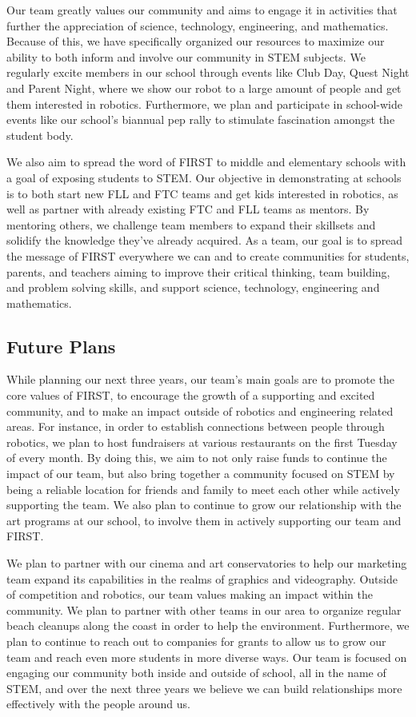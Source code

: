 Our team greatly values our community and aims to engage it in activities that further the appreciation of science, technology, engineering, and mathematics. Because of this, we have specifically organized our resources to maximize our ability to both inform and involve our community in STEM subjects. We regularly excite members in our school through events like Club Day, Quest Night and Parent Night, where we show our robot to a large amount of people and get them interested in robotics. Furthermore, we plan and participate in school-wide events like our school’s biannual pep rally to stimulate fascination amongst the student body. 

We also aim to spread the word of FIRST to middle and elementary schools with a goal of exposing students to STEM. Our objective in demonstrating at schools is to both start new FLL and FTC teams and get kids interested in robotics, as well as partner with already existing FTC and FLL teams as mentors. By mentoring others, we challenge team members to expand their skillsets and solidify the knowledge they’ve already acquired. As a team, our goal is to spread the message of FIRST everywhere we can and to create communities for students, parents, and teachers aiming to improve their critical thinking, team building, and problem solving skills, and support science, technology, engineering and mathematics.

\subsection{Future Plans}

While planning our next three years, our team’s main goals are to promote the core values of FIRST, to encourage the growth of a supporting and excited community, and to make an impact outside of robotics and engineering related areas. For instance, in order to establish connections between people through robotics, we plan to host fundraisers at various restaurants on the first Tuesday of every month. By doing this, we aim to not only raise funds to continue the impact of our team, but also bring together a community focused on STEM by being a reliable location for friends and family to meet each other while actively supporting the team. We also plan to continue to grow our relationship with the art programs at our school, to involve them in actively supporting our team and FIRST. 

We plan to partner with our cinema and art conservatories to help our marketing team expand its capabilities in the realms of graphics and videography. Outside of competition and robotics, our team values making an impact within the community. We plan to partner with other teams in our area to organize regular beach cleanups along the coast in order to help the environment. Furthermore, we plan to continue to reach out to companies for grants to allow us to grow our team and reach even more students in more diverse ways. Our team is focused on engaging our community both inside and outside of school, all in the name of STEM, and over the next three years we believe we can build relationships more effectively with the people around us.

